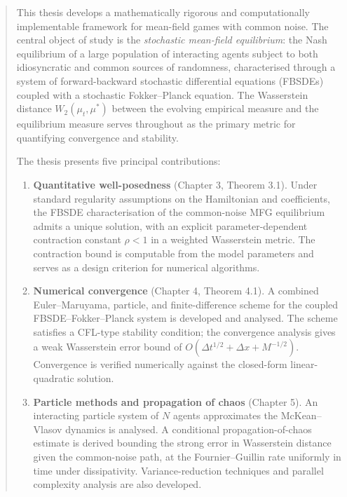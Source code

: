 \begin{abstract}

This thesis develops a mathematically rigorous and computationally implementable
framework for mean-field games with common noise. The central object of study is the
\emph{stochastic mean-field equilibrium}: the Nash equilibrium of a large population
of interacting agents subject to both idiosyncratic and common sources of randomness,
characterised through a system of forward-backward stochastic differential equations
(FBSDEs) coupled with a stochastic Fokker--Planck equation. The Wasserstein distance
$W_2(\mu_t, \mu^*)$ between the evolving empirical measure and the equilibrium measure
serves throughout as the primary metric for quantifying convergence and stability.

The thesis presents five principal contributions:

\begin{enumerate}
    \item \textbf{Quantitative well-posedness} (Chapter 3, Theorem 3.1).
    Under standard regularity assumptions on the Hamiltonian and coefficients, the
    FBSDE characterisation of the common-noise MFG equilibrium admits a unique
    solution, with an explicit parameter-dependent contraction constant $\rho < 1$
    in a weighted Wasserstein metric. The contraction bound is computable from the model parameters and serves as a design criterion for numerical algorithms.

    \item \textbf{Numerical convergence} (Chapter 4, Theorem 4.1). A combined
    Euler--Maruyama, particle, and finite-difference scheme for the coupled
    FBSDE--Fokker--Planck
    system is developed and analysed. The scheme satisfies a CFL-type stability
    condition; the convergence analysis gives a weak Wasserstein error bound of
    $O(\Delta t^{1/2} + \Delta x + M^{-1/2})$. Convergence is verified numerically
    against the closed-form linear-quadratic solution.

    \item \textbf{Particle methods and propagation of chaos} (Chapter 5).
    An interacting particle system of $N$ agents approximates the McKean--Vlasov
    dynamics is analysed. A conditional propagation-of-chaos estimate is derived
    bounding the strong error in Wasserstein distance given the common-noise path,
    at the Fournier--Guillin rate uniformly in time under dissipativity.
    Variance-reduction techniques and parallel complexity analysis are also developed.


\end{enumerate}
\end{abstract}
